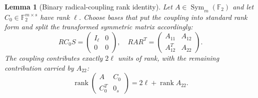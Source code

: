 \documentclass[11pt]{article}
\newcommand{\F}{\mathbb F}
\newcommand{\Sym}{\operatorname{Sym}}
\newcommand{\rank}{\operatorname{rank}}
\newcommand{\1}{\mathbf 1}
\theoremstyle{plain}
\newtheorem{lemma}[theorem]{Lemma}
\theoremstyle{definition}
\theoremstyle{remark}
\begin{document}
\begin{lemma}[Binary radical-coupling rank identity]
\label{lem:binary-radical-rank-identity}
Let $A\in\Sym_m(\F_2)$ and let $C_0\in\F_2^{m\times s}$ have rank
$\ell$.  Choose bases that put the coupling into standard rank form and split
the transformed symmetric matrix accordingly:
\begin{equation}
 RC_0S=\begin{pmatrix}I_\ell&0\\0&0\end{pmatrix},
 \quad
 RAR^T=\begin{pmatrix}A_{11}&A_{12}\\A_{12}^T&A_{22}\end{pmatrix}.
 \label{eq:binary-radical-normal-forms}
\end{equation}
The coupling contributes exactly $2\ell$ units of rank, with the remaining
contribution carried by $A_{22}$:
\begin{equation}
 \rank\begin{pmatrix}A&C_0\\C_0^T&0_s\end{pmatrix}
 =2\ell+\rank A_{22}.
 \label{eq:binary-radical-rank-identity}
\end{equation}
\end{lemma}
\end{document}
